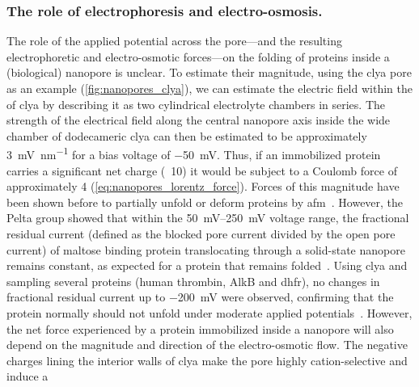\subsubsection{The role of electrophoresis and electro-osmosis.}
%

The role of the applied potential across the pore---and the resulting electrophoretic and electro-osmotic
forces---on the folding of proteins inside a (biological) nanopore is unclear. To estimate their magnitude,
using the \gls{clya} pore as an example (\cref{fig:nanopores_clya}), we can estimate the electric field within
the \lumen{} of \gls{clya} by describing it as two cylindrical electrolyte chambers in series. The strength of
the electrical field along the central nanopore axis inside the wide \cisi{} chamber of dodecameric \gls{clya}
can then be estimated to be approximately \SI{3}{\mV\per\nm} for a bias voltage of
\SI{-50}{\mV}.\footnotemark%
%
%
Thus, if an immobilized protein carries a significant net charge (\eg~\SI{10}{\ec}) it would be subject to a
Coulomb force of approximately \SI{4}{\pN} (\cref{eq:nanopores_lorentz_force}). Forces of this magnitude have
been shown before to partially unfold or deform proteins by \gls{afm}~\cite{Best-2001}. However, the Pelta
group showed that within the \SIrange{50}{250}{\mV} voltage range, the fractional residual current (defined as
the blocked pore current divided by the open pore current) of maltose binding protein translocating through a
solid-state nanopore remains constant, as expected for a protein that remains folded~\cite{Talaga-2009}. Using
\gls{clya} and sampling several proteins (human thrombin, {AlkB} and \gls{dhfr}), no changes in fractional
residual current up to \SI{-200}{\mV} were observed, confirming that the protein normally should not unfold
under moderate applied potentials~\cite{Soskine-2013}. However, the net force experienced by a protein
immobilized inside a nanopore will also depend on the magnitude and direction of the electro-osmotic flow. The
negative charges lining the interior walls of \gls{clya} make the pore highly cation-selective and induce a
